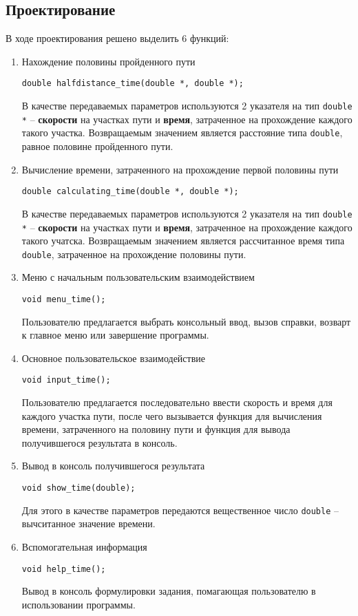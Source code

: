 \documentclass[12pt,a4paper]{report}
\begin{document}
\subsection{Проектирование}
\hspace{\parindent}В ходе проектирования решено выделить 6 функций:
\begin{enumerate}
	\item Нахождение половины пройденного пути
	
	\verb+double halfdistance_time(double *, double *);+
	
	В качестве передаваемых параметров используются 2 указателя на тип \texttt{double *} -- \textbf{скорости}  на участках пути и \textbf{время}, затраченное на прохождение каждого такого участка. Возвращаемым значением является расстояние типа \verb+double+, равное половине пройденного пути.
		 
	\item Вычисление времени, затраченного на прохождение первой половины пути
	
	\verb+double calculating_time(double *, double *);+
	
	В качестве передаваемых параметров используются 2 указателя на тип \texttt{double *} -- \textbf{скорости}  на участках пути и \textbf{время}, затраченное на прохождение каждого такого учатска. Возвращаемым значением является рассчитанное время типа \verb+double+, затраченное на прохождение половины пути.
		 
	\item Меню с начальным пользовательским взаимодействием
	
	\verb+void menu_time();+
	
	Пользователю предлагается выбрать консольный ввод, вызов справки, возварт к главное меню или завершение программы.
	
	\item Основное пользовательское взаимодействие
	
	\verb+void input_time();+
	
	Пользователю предлагается последовательно ввести скорость и время для каждого участка пути, после чего вызывается функция для вычисления времени, затраченного на половину пути и функция для вывода получившегося результата в консоль.
	
	\item Вывод в консоль получившегося результата
	
	\verb+void show_time(double);+
	
	Для этого в качестве параметров передаются вещественное число \texttt{double} -- вычситанное значение времени.

	\item Вспомогательная информация
	
	\verb+void help_time();+
	
	Вывод в консоль формулировки задания, помагающая пользователю в использовании программы.
\end{enumerate}
\end{document}
